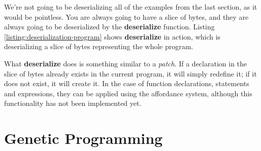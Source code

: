 \documentclass[11pt,fleqn,openany]{book} %
\begin{document}
We're not going to be deserializing all of the examples from the last section, as it would be pointless. You are always going to have a slice of bytes, and they are always going to be deserialized by the \textbf{deserialize} function. Listing \ref{listing:deserialization-program} shows \textbf{deserialize} in action, which is deserializing a slice of bytes representing the whole program.

What \textbf{deserialize} does is something similar to a \emph{patch}. If a declaration in the slice of bytes already exists in the current program, it will simply redefine it; if it does not exist, it will create it. In the case of function declarations, statements and expressions, they can be applied using the affordance system, although this functionality has not been implemented yet.


\chapter{Genetic Programming}
\label{chapter:genetic-programming}

\end{document}
